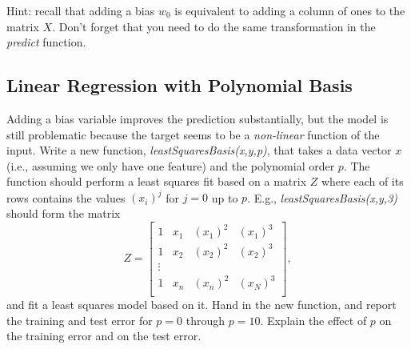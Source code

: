 \documentclass{article}
\def\blu#1{{\color{blu}#1}}
\begin{document}
Hint: recall that adding a bias $w_0$ is equivalent to adding a column of ones to the matrix $X$. Don't forget that you need to do the same transformation in the \emph{predict} function.


\pagebreak

\subsection{Linear Regression with Polynomial Basis}

Adding a bias variable improves the prediction substantially, but the model is still problematic because the target seems to be a \emph{non-linear} function of the input. Write a new function, \emph{leastSquaresBasis(x,y,p)}, that takes a data vector $x$ (i.e., assuming we only have one feature) and the polynomial order $p$. The function should perform a least squares fit based on a matrix $Z$ where each of its rows contains the values $(x_{i})^j$ for $j=0$ up to $p$. E.g., \emph{leastSquaresBasis(x,y,3)} should form the matrix
\[
Z =
\left[\begin{array}{cccc}
1 & x_1 & (x_1)^2 & (x_1)^3\\
1 & x_2 & (x_2)^2 & (x_2)^3\\
\vdots\\
1 & x_n & (x_n)^2 & (x_N)^3\\
\end{array}
\right],
\]
and fit a least squares model based on it.
\blu{Hand in the new function, and report the training and test error for $p = 0$ through $p= 10$. Explain the effect of $p$ on the training error and on the test error.}
\end{document}
